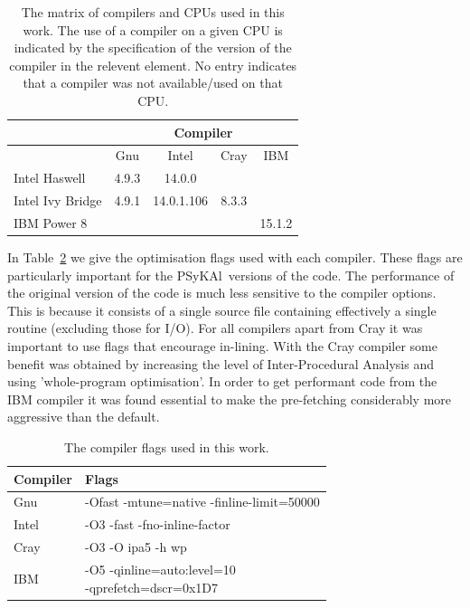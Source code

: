 \documentclass{IOS-Book-Article}
\newcommand{\psykal}{{PS}y{KA}l}
\begin{document}
\begin{table}[!t]
\renewcommand{\arraystretch}{1.3}
\caption{The matrix of compilers and CPUs used in this work. The use
  of a compiler on a given CPU is indicated by the specification of
  the version of the compiler in the relevent element. No entry
  indicates that a compiler was not available/used on that CPU.}
\label{TABLE_compilers}
\centering
\begin{tabular}{|l|c|c|c|c|}
\hline
                 & \multicolumn{4}{c|}{Compiler}             \\
\hline
                 & Gnu   & Intel       & Cray    & IBM     \\
\hline
Intel Haswell    & 4.9.3 & 14.0.0      &         &          \\
Intel Ivy Bridge & 4.9.1 & 14.0.1.106  & 8.3.3   &          \\
IBM Power 8      &       &             &         & 15.1.2     \\
\hline
\end{tabular}
\end{table}

In Table~\ref{TABLE_compiler_flags} we give the optimisation flags
used with each compiler. These flags are particularly important for
the \psykal\ versions of the code. The performance of the original
version of the code is much less sensitive to the compiler
options. This is because it consists of a single source file
containing effectively a single routine (excluding those for I/O).
For all compilers apart from Cray it was important to use flags that
encourage in-lining. With the Cray compiler some benefit was obtained
by increasing the level of Inter-Procedural Analysis and using
'whole-program optimisation'. In order to get performant code from the
IBM compiler it was found essential to make the pre-fetching
considerably more aggressive than the default.
 
\begin{table}[!t]
\renewcommand{\arraystretch}{1.3}
\caption{The compiler flags used in this work.}
\label{TABLE_compiler_flags}
\centering
\begin{tabular}{l|l}
\hline
Compiler  &  Flags \\
\hline
Gnu       & -Ofast -mtune=native -finline-limit=50000    \\
Intel     & -O3 -fast -fno-inline-factor    \\
Cray      & -O3 -O ipa5 -h wp               \\
IBM       & \parbox{5cm}{-O5 -qinline=auto:level=10\\ -qprefetch=dscr=0x1D7} \\
\hline
\end{tabular}
\end{table}
\end{document}
